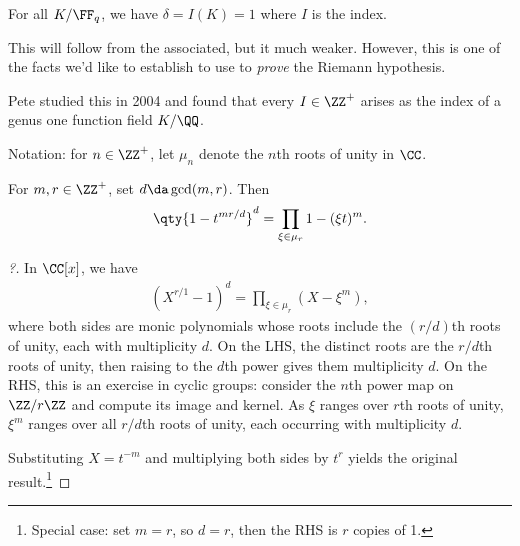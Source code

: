 \begin{theorem}[F.K. Schmidt]

For all \(K/\FF_q\), we have \(\delta = I(K) = 1\) where \(I\) is the
index.

\end{theorem}

This will follow from the associated, but it much weaker. However, this
is one of the facts we'd like to establish to use to \emph{prove} the
Riemann hypothesis.

\begin{remark}

Pete studied this in 2004 and found that every \(I\in \ZZ^+\) arises as
the index of a genus one function field \(K/\QQ\).

\end{remark}

Notation: for \(n\in\ZZ^+\), let \(\mu_n\) denote the \(n\)th roots of
unity in \(\CC\).

\begin{lemma}[?]

For \(m, r\in \ZZ^+\), set \(d \da \gcd(m, r)\). Then
\begin{align*}  
\qty{1-t^{mr/d}}^d = \prod_{\xi\in \mu_r}  1 - (\xi t)^m
.\end{align*}

\end{lemma}

\begin{proof}[?]

In \(\CC[x]\), we have
\begin{align*}  
(X^{r/1} - 1)^d = \prod_{\xi\in \mu_r}(X - \xi^m)
,\end{align*} where both sides are monic polynomials whose roots include
the \((r/d)\)th roots of unity, each with multiplicity \(d\). On the
LHS, the distinct roots are the \(r/d\)th roots of unity, then raising
to the \(d\)th power gives them multiplicity \(d\). On the RHS, this is
an exercise in cyclic groups: consider the \(n\)th power map on
\(\ZZ/r\ZZ\) and compute its image and kernel. As \(\xi\) ranges over
\(r\)th roots of unity, \(\xi^m\) ranges over all \(r/d\)th roots of
unity, each occurring with multiplicity \(d\).

Substituting \(X= t^{-m}\) and multiplying both sides by \(t^r\) yields
the original result.\footnote{Special case: set \(m=r\), so \(d=r\),
  then the RHS is \(r\) copies of 1.}

\end{proof}

